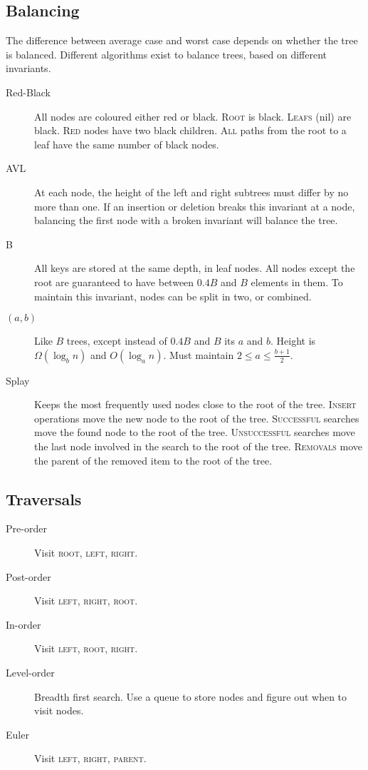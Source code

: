\documentclass[landscape]{cheat}
\begin{document}
\begin{multicols}{3}
\subsection{Balancing}
The difference between average case and worst case depends on whether the tree is balanced.
Different algorithms exist to balance trees, based on different invariants.

\begin{description}
    \item[Red-Black]
        All nodes are coloured either red or black.
        \textsc{Root} is black.
        \textsc{Leafs} (nil) are black.
        \textsc{Red} nodes have two black children.
        \textsc{All} paths from the root to a leaf have the same number of black nodes.
    \item[AVL]
        At each node, the height of the left and right subtrees must differ by no more than one.
        If an insertion or deletion breaks this invariant at a node, balancing the first node with a broken invariant will balance the tree.
    \item[B]
        All keys are stored at the same depth, in leaf nodes.
        All nodes except the root are guaranteed to have between $0.4B$ and $B$ elements in them.
        To maintain this invariant, nodes can be split in two, or combined.
    \item[$(a,b)$]
        Like $B$ trees, except instead of $0.4B$ and $B$ its $a$ and $b$.
        Height is $\Omega(\log_b n)$ and $O(\log_a n)$.
        Must maintain $2 \leq a \leq \frac {b+1} 2$.
    \item[Splay]
        Keeps the most frequently used nodes close to the root of the tree.
        \textsc{Insert} operations move the new node to the root of the tree.
        \textsc{Successful} searches move the found node to the root of the tree.
        \textsc{Unsuccessful} searches move the last node involved in the search to the root of the tree.
        \textsc{Removals} move the parent of the removed item to the root of the tree.
\end{description}

\subsection{Traversals}
\begin{description}
    \item[Pre-order] Visit \textsc{root}, \textsc{left}, \textsc{right}.
    \item[Post-order] Visit \textsc{left}, \textsc{right}, \textsc{root}.
    \item[In-order] Visit \textsc{left}, \textsc{root}, \textsc{right}.
    \item[Level-order] Breadth first search. Use a queue to store nodes and figure out when to visit nodes.
    \item[Euler] Visit \textsc{left}, \textsc{right}, \textsc{parent}.
\end{description}


\end{multicols}
\end{document}
